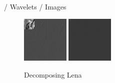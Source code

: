 \documentclass{beamer}
\def\RImageSize{0.2\textwidth}
\def\RImageSpace{\hspace{1cm}}
\begin{document}
\begin{frame}{/ Wavelets / Images}
\begin{figure}[hbt]
\begin{center}
    \end{center}
  \end{figure}
  \pause
  \begin{figure}[hbt]
    \begin{center}
      \includegraphics[width=\RImageSize]{lena-2step.jpg}
      \RImageSpace
      \pause
      \includegraphics[width=\RImageSize]{lena-9step.jpg}
      \caption{Decomposing Lena}
    \end{center}
  \end{figure}

\end{frame}
\end{document}
